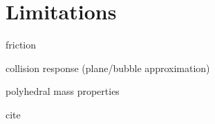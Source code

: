 \section{Limitations}
friction

collision response (plane/bubble approximation)

polyhedral mass properties


cite \cite{Mirtich:96}

